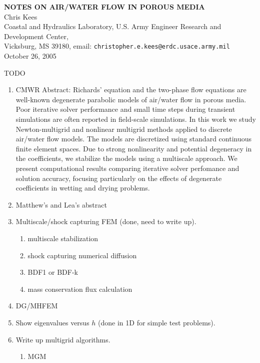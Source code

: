 \documentclass[10pt,dvips,twoside,reqno]{amsart}
\begin{document}
\begin{center}
  {\bf NOTES ON AIR/WATER FLOW IN POROUS MEDIA} \\
  Chris Kees\\
  Coastal and Hydraulics Laboratory,
  U.S. Army Engineer Research and Development Center,\\
  Vicksburg, MS 39180, email: \texttt{christopher.e.kees@erdc.usace.army.mil} \\
  October 26, 2005
\end{center}

\begin{center} TODO \end{center}
\begin{enumerate}
\item CMWR Abstract: Richards' equation and the two-phase flow
  equations are well-known degenerate parabolic models of air/water
  flow in porous media. Poor iterative solver performance and small
  time steps during transient simulations are often reported in
  field-scale simulations. In this work we study Newton-multigrid and
  nonlinear multigrid methods applied to discrete air/water flow
  models. The models are discretized using standard continuous finite
  element spaces. Due to strong nonlinearity and potential degeneracy
  in the coefficients, we stabilize the models using a multiscale
  approach. We present computational results comparing iterative
  solver perfomance and solution accuracy, focusing particularly on
  the effects of degenerate coefficients in wetting and drying
  problems.
\item Matthew's and Lea's abstract
\item Multiscale/shock capturing FEM (done, need to write up).
\begin{enumerate}
\item multiscale stabilization
\item shock capturing numerical diffusion
\item BDF1 or BDF-k 
\item mass conservation flux calculation
\end{enumerate}
\item DG/MHFEM
\item Show eigenvalues versus $h$ (done in 1D for simple test problems).
\item Write up multigrid algorithms.
\begin{enumerate}
\item MGM

\end{enumerate}
\end{enumerate}
\end{document}
